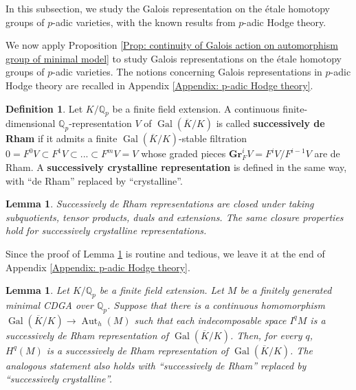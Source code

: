 \documentclass[11pt]{amsart}
\newtheorem{lemma}[theorem]{Lemma}
\theoremstyle{definition}
\newtheorem{definition}[theorem]{Definition}
\numberwithin{equation}{section}
\numberwithin{equation}{section}
\newcommand\QQ{\mathbb{Q}}
\DeclareMathOperator{\Aut}{Aut}
\DeclareMathOperator{\Gal}{Gal}
\newcommand{\catname}[1]{\textbf{#1}}
\newcommand{\Gr}{\catname{Gr}}
\begin{document}
In this subsection, we study the Galois representation on the \'etale homotopy groups of $p$-adic varieties, with the known results from $p$-adic Hodge theory.

We now apply Proposition \ref{Prop: continuity of Galois action on automorphism group of minimal model} to study Galois representations on the \'etale homotopy groups of $p$-adic varieties. The notions concerning Galois representations in $p$-adic Hodge theory are recalled in Appendix \ref{Appendix: p-adic Hodge theory}. 


\begin{definition}\label{Def: successively de Rham}
Let $K/\QQ_p$ be a finite field extension.
A continuous finite-dimensional $\QQ_p$-representation $V$ of $\Gal(\overline{K}/K)$ is called \textbf{successively de Rham} if it admits a finite $\Gal(\overline{K}/K)$-stable filtration $0=F^0V\subset F^1V\subset ...\subset F^mV=V$ whose graded pieces $\Gr^i_FV=F^iV/F^{i-1}V$ are de Rham. A \textbf{successively crystalline representation} is defined in the same way, with ``de Rham'' replaced by ``crystalline''.
\end{definition}

\begin{lemma}\label{Lem: Closure of algebraic operations of de Rham representations}
Successively de Rham representations are closed under taking subquotients, tensor products, duals and extensions. The same closure properties hold for successively crystalline representations.
\end{lemma}

Since the proof of Lemma \ref{Lem: Closure of algebraic operations of de Rham representations} is routine and tedious, we leave it at the end of Appendix \ref{Appendix: p-adic Hodge theory}.


\begin{lemma}\label{Lem: successive de Rham on indecomposables implies the property for cohomology}
Let $K/\QQ_p$ be a finite field extension.
Let $M$ be a finitely generated minimal CDGA over $\QQ_p$. Suppose that there is  a continuous homomorphism $\Gal(\overline{K}/K)\rightarrow \Aut_h(M)$ such that each indecomposable space $I^qM$ is a successively de Rham representation of $\Gal(\overline{K}/K)$. Then, for every $q$, $H^q(M)$ is a successively de Rham representation of $\Gal(\overline{K}/K)$. The analogous statement also holds with ``successively de Rham'' replaced by ``successively crystalline''.
\end{lemma}
\end{document}
